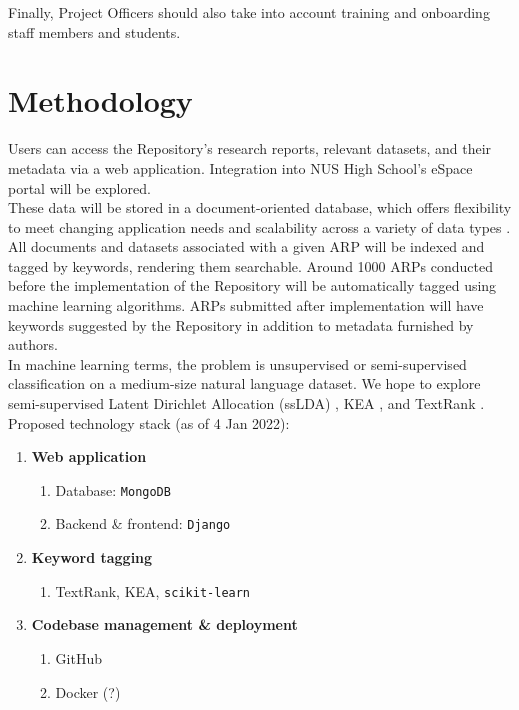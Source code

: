 \documentclass{article}
\begin{document}
Finally, Project Officers should also take into account training and onboarding staff members and students.

\section{Methodology}

Users can access the Repository’s research reports, relevant datasets, and their metadata via a web application. Integration into NUS High School’s eSpace portal will be explored. \\

These data will be stored in a document-oriented database, which offers flexibility to meet changing application needs and scalability across a variety of data types \parencite{mongodb_document_nodate}. \\

All documents and datasets associated with a given ARP will be indexed and tagged by keywords, rendering them searchable. Around 1000 ARPs conducted before the implementation of the Repository will be automatically tagged using machine learning algorithms. ARPs submitted after implementation will have keywords suggested by the Repository in addition to metadata furnished by authors. \\

In machine learning terms, the problem is unsupervised or semi-supervised classification on a medium-size natural language dataset. We hope to explore semi-supervised Latent Dirichlet Allocation (ssLDA) \parencite{wang_semi-supervised_2012}, KEA \parencite{witten_kea_2005}, and TextRank \parencite{mihalcea_textrank_2004}. \\

Proposed technology stack (as of 4 Jan 2022):

\begin{enumerate}[label=\alph*)]
    \item \textbf{Web application}
    \begin{enumerate}[label=\roman*.]
        \item Database: \texttt{MongoDB}
        \item Backend \& frontend: \texttt{Django}
    \end{enumerate}
    \item \textbf{Keyword tagging}
    \begin{enumerate}[label={}]
        \item TextRank, KEA, \texttt{scikit-learn}
    \end{enumerate}
    \item \textbf{Codebase management \& deployment}
    \begin{enumerate}[label=\roman*.]
        \item GitHub
        \item Docker (?)
    \end{enumerate}
\end{enumerate}
\end{document}
